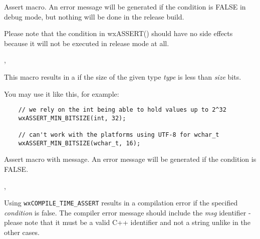 \label{wxassert}


Assert macro. An error message will be generated if the condition is FALSE in
debug mode, but nothing will be done in the release build.

Please note that the condition in wxASSERT() should have no side effects
because it will not be executed in release mode at all.


,\\

\label{wxassertminbitsize}


This macro results in a 
 if the size
of the given type {\it type} is less than {\it size} bits.

You may use it like this, for example:

\begin{verbatim}
    // we rely on the int being able to hold values up to 2^32
    wxASSERT_MIN_BITSIZE(int, 32);

    // can't work with the platforms using UTF-8 for wchar_t
    wxASSERT_MIN_BITSIZE(wchar_t, 16);
\end{verbatim}

\label{wxassertmsg}


Assert macro with message. An error message will be generated if the condition is FALSE.


,\\

\label{wxcompiletimeassert}


Using {\tt wxCOMPILE\_TIME\_ASSERT} results in a compilation error if the
specified {\it condition} is false. The compiler error message should include
the {\it msg} identifier - please note that it must be a valid C++ identifier
and not a string unlike in the other cases.

